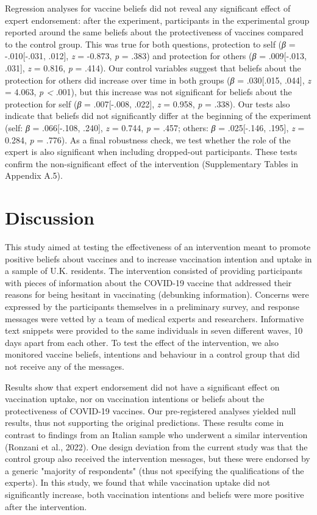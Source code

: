 \documentclass[authordate, empirical]{jote-new-article}
\begin{document}
Regression analyses for vaccine beliefs did not reveal any significant effect of expert endorsement: after the experiment, participants in the experimental group reported around the same beliefs about the protectiveness of vaccines compared to the control group. This was true for both questions, protection to self (\emph{β }= -.010[-.031, .012], \emph{z }= -0.873, \emph{p }= .383) and protection for others (\emph{β }= .009[-.013, .031], \emph{z }= 0.816, \emph{p }= .414). Our control variables suggest that beliefs about the protection for others did increase over time in both groups (\emph{β }= .030[.015, .044], \emph{z }= 4.063, \emph{p < }.001), but this increase was not significant for beliefs about the protection for self (\emph{β }= .007[-.008, .022], \emph{z }= 0.958, \emph{p }= .338). Our tests also indicate that beliefs did not significantly differ at the beginning of the experiment (self: \emph{β }= .066[-.108, .240], \emph{z }= 0.744, \emph{p }= .457; others: \emph{β }= .025[-.146, .195], \emph{z }= 0.284, \emph{p }= .776). As a final robustness check, we test whether the role of the expert is also significant when including dropped-out participants. These tests confirm the non-significant effect of the intervention (Supplementary Tables in Appendix A.5).



\section{Discussion}



This study aimed at testing the effectiveness of an intervention meant to promote positive beliefs about vaccines and to increase vaccination intention and uptake in a sample of U.K. residents. The intervention consisted of providing participants with pieces of information about the COVID-19 vaccine that addressed their reasons for being hesitant in vaccinating (debunking information). Concerns were expressed by the participants themselves in a preliminary survey, and response messages were vetted by a team of medical experts and researchers. Informative text snippets were provided to the same individuals in seven different waves, 10 days apart from each other. To test the effect of the intervention, we also monitored vaccine beliefs, intentions and behaviour in a control group that did not receive any of the messages.



Results show that expert endorsement did not have a significant effect on vaccination uptake, nor on vaccination intentions or beliefs about the protectiveness of COVID-19 vaccines. Our pre-registered analyses yielded null results, thus not supporting the original predictions. These results come in contrast to findings from an Italian sample who underwent a similar intervention (Ronzani et al., 2022). One design deviation from the current study was that the control group also received the intervention messages, but these were endorsed by a generic "majority of respondents" (thus not specifying the qualifications of the experts). In this study, we found that while vaccination uptake did not significantly increase, both vaccination intentions and beliefs were more positive after the intervention.
\end{document}
